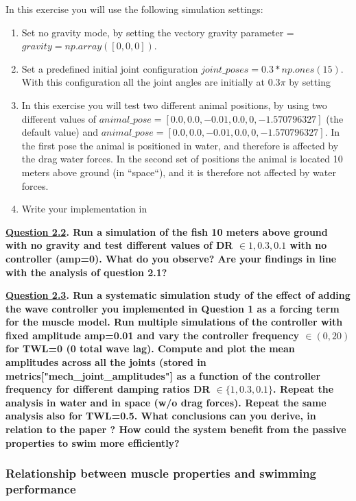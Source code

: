 \documentclass{cmc}
\begin{document}
In this exercise you will use the following simulation settings:
\begin{enumerate}
    \item Set no gravity mode, by setting the vectory gravity parameter = $gravity = np.array([0,0,0])$.
    \item Set a predefined initial joint configuration $joint\_poses = 0.3*np.ones(15)$. With this configuration all the joint angles are initially at $0.3 \pi$ by setting
    \item In this exercise you will test two different animal positions, by using two different values of $animal\_pose = [0.0, 0.0, -0.01, 0.0, 0, -1.570796327]$ (the default value) and $animal\_pose = [0.0, 0.0, -0.01, 0.0, 0, -1.570796327]$. In the first pose the animal is positioned in water, and therefore is affected by the drag water forces. In the second set of positions the animal is located 10 meters above ground (in ``space``), and it is therefore not affected by water forces.
    \item Write your implementation in 
\end{enumerate}

\textbf{\underline{Question 2.2}. Run a simulation of the fish 10 meters above ground with no gravity and test different values of DR $\in {1,0.3,0.1}$ with no controller (amp=0). What do you observe? Are your findings in line with the analysis of question 2.1? }



\textbf{\underline{Question 2.3}. Run a systematic simulation study of the effect of adding the wave controller you implemented in Question 1 as a forcing term for the muscle model. Run multiple simulations of the controller with fixed amplitude amp=0.01 and vary the controller frequency $\in \left( 0,20 \right)$ for TWL=0 (0 total wave lag). Compute and plot the mean amplitudes across all the joints (stored in metrics["mech\_joint\_amplitudes"] as a function of the controller frequency for different damping ratios DR $\in \{1,0.3,0.1\}$. Repeat the analysis in water and in space (w/o drag forces). Repeat the same analysis also for TWL=0.5. What conclusions can you derive, in relation to the paper \cite{tytell2014role}? How could the system benefit from the passive properties to swim more efficiently?
}




\subsubsection*{Relationship between muscle properties and swimming performance}
\end{document}
